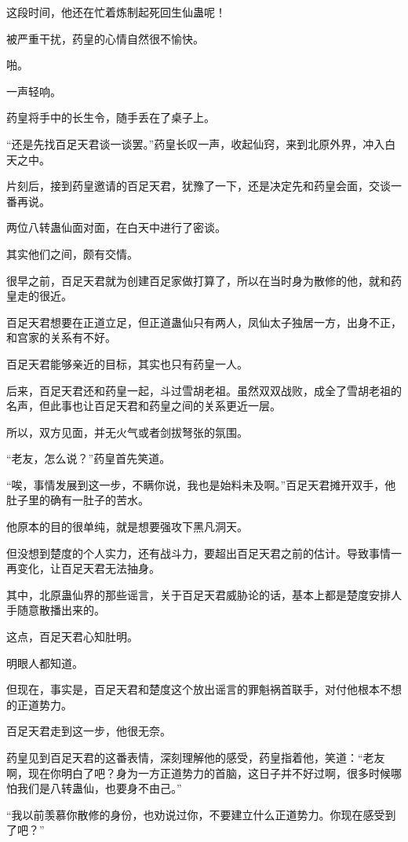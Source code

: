\begin{this_body}
这段时间，他还在忙着炼制起死回生仙蛊呢！

被严重干扰，药皇的心情自然很不愉快。

啪。

一声轻响。

药皇将手中的长生令，随手丢在了桌子上。

“还是先找百足天君谈一谈罢。”药皇长叹一声，收起仙窍，来到北原外界，冲入白天之中。

片刻后，接到药皇邀请的百足天君，犹豫了一下，还是决定先和药皇会面，交谈一番再说。

两位八转蛊仙面对面，在白天中进行了密谈。

其实他们之间，颇有交情。

很早之前，百足天君就为创建百足家做打算了，所以在当时身为散修的他，就和药皇走的很近。

百足天君想要在正道立足，但正道蛊仙只有两人，凤仙太子独居一方，出身不正，和宫家的关系有不好。

百足天君能够亲近的目标，其实也只有药皇一人。

后来，百足天君还和药皇一起，斗过雪胡老祖。虽然双双战败，成全了雪胡老祖的名声，但此事也让百足天君和药皇之间的关系更近一层。

所以，双方见面，并无火气或者剑拔弩张的氛围。

“老友，怎么说？”药皇首先笑道。

“唉，事情发展到这一步，不瞒你说，我也是始料未及啊。”百足天君摊开双手，他肚子里的确有一肚子的苦水。

他原本的目的很单纯，就是想要强攻下黑凡洞天。

但没想到楚度的个人实力，还有战斗力，要超出百足天君之前的估计。导致事情一再变化，让百足天君无法抽身。

其中，北原蛊仙界的那些谣言，关于百足天君威胁论的话，基本上都是楚度安排人手随意散播出来的。

这点，百足天君心知肚明。

明眼人都知道。

但现在，事实是，百足天君和楚度这个放出谣言的罪魁祸首联手，对付他根本不想的正道势力。

百足天君走到这一步，他很无奈。

药皇见到百足天君的这番表情，深刻理解他的感受，药皇指着他，笑道：“老友啊，现在你明白了吧？身为一方正道势力的首脑，这日子并不好过啊，很多时候哪怕我们是八转蛊仙，也要身不由己。”

“我以前羡慕你散修的身份，也劝说过你，不要建立什么正道势力。你现在感受到了吧？”


\end{this_body}

